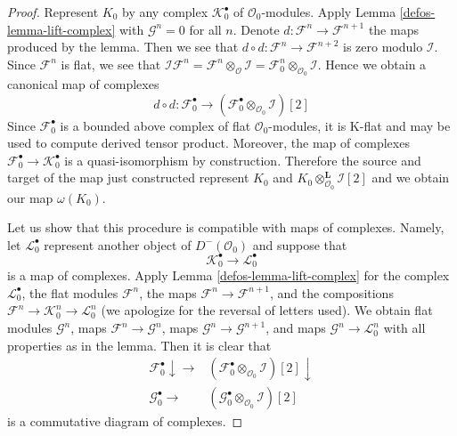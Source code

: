 \begin{proof}

Represent $K_0$ by any complex
$\mathcal{K}_0^\bullet$ of $\mathcal{O}_0$-modules.
Apply Lemma \ref{defos-lemma-lift-complex}
with $\mathcal{G}^n = 0$ for all $n$.
Denote $d : \mathcal{F}^n \to \mathcal{F}^{n + 1}$
the maps produced by the lemma. Then we see that
$d \circ d : \mathcal{F}^n \to \mathcal{F}^{n + 2}$
is zero modulo $\mathcal{I}$. Since $\mathcal{F}^n$ is flat,
we see that
$\mathcal{I}\mathcal{F}^n =
\mathcal{F}^n \otimes_{\mathcal{O}} \mathcal{I} =
\mathcal{F}^n_0 \otimes_{\mathcal{O}_0} \mathcal{I}$.
Hence we obtain a canonical map of complexes
$$
d \circ d : \mathcal{F}_0^\bullet
\longrightarrow
(\mathcal{F}_0^\bullet \otimes_{\mathcal{O}_0} \mathcal{I})[2]
$$
Since $\mathcal{F}_0^\bullet$ is a bounded above complex
of flat $\mathcal{O}_0$-modules, it is K-flat and may be used
to compute derived tensor product. Moreover, the map of
complexes $\mathcal{F}_0^\bullet \to \mathcal{K}_0^\bullet$
is a quasi-isomorphism by construction. Therefore the source and
target of the map just constructed represent $K_0$ and
$K_0 \otimes_{\mathcal{O}_0}^\mathbf{L} \mathcal{I}[2]$
and we obtain our map $\omega(K_0)$.

\medskip\noindent
Let us show that this procedure is compatible with maps of complexes.
Namely, let $\mathcal{L}_0^\bullet$ represent another object of
$D^-(\mathcal{O}_0)$ and suppose that
$$
\mathcal{K}_0^\bullet \longrightarrow \mathcal{L}_0^\bullet
$$
is a map of complexes. Apply Lemma \ref{defos-lemma-lift-complex}
for the complex $\mathcal{L}_0^\bullet$, the flat modules
$\mathcal{F}^n$, the maps $\mathcal{F}^n \to \mathcal{F}^{n + 1}$,
and the compositions
$\mathcal{F}^n \to \mathcal{K}_0^n \to \mathcal{L}_0^n$
(we apologize for the reversal of letters used).
We obtain flat modules $\mathcal{G}^n$, maps
$\mathcal{F}^n \to \mathcal{G}^n$, maps
$\mathcal{G}^n \to \mathcal{G}^{n + 1}$, and maps
$\mathcal{G}^n \to \mathcal{L}_0^n$ with all properties
as in the lemma. Then it is clear that
$$
\begin{array}{cc}\mathcal{F}_0^\bullet \downarrow\longrightarrow & (\mathcal{F}_0^\bullet \otimes_{\mathcal{O}_0} \mathcal{I})[2] \downarrow \\ \mathcal{G}_0^\bullet \longrightarrow & (\mathcal{G}_0^\bullet \otimes_{\mathcal{O}_0} \mathcal{I})[2]\end{array}
$$
is a commutative diagram of complexes.


\end{proof}
